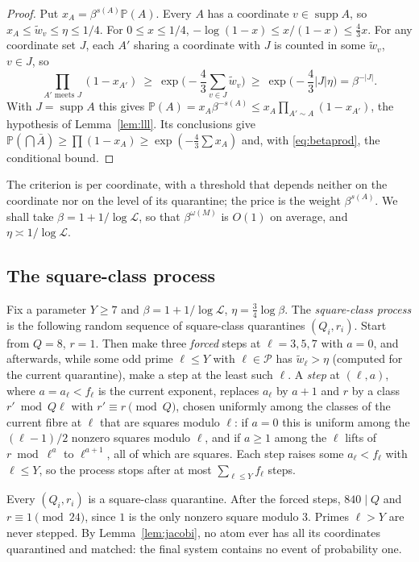 \documentclass[11pt,reqno]{amsart}
\theoremstyle{definition}
\newcommand{\cP}{\mathcal P}
\newcommand{\Lc}{\mathcal L}
\newcommand{\PP}{\mathbb P}
\newcommand{\supp}{\operatorname{supp}}
\begin{document}
\begin{proof}
Put $x_A=\beta^{s(A)}\PP(A)$.  Every $A$ has a coordinate $v\in\supp A$, so
$x_A\le\tilde w_v\le\eta\le1/4$.  For $0\le x\le1/4$,
$-\log(1-x)\le x/(1-x)\le\frac43x$.  For any coordinate set $J$, each $A'$
sharing a coordinate with $J$ is counted in some $\tilde w_v$, $v\in J$, so
\begin{equation}\label{eq:betaprod}
 \prod_{A'\text{ meets }J}(1-x_{A'})\ \ge\ \exp\Big(-\frac43\sum_{v\in J}\tilde w_v\Big)\ \ge\ \exp\Big(-\frac43|J|\eta\Big)=\beta^{-|J|}.
\end{equation}
With $J=\supp A$ this gives $\PP(A)=x_A\beta^{-s(A)}\le x_A\prod_{A'\sim A}(1-x_{A'})$,
the hypothesis of Lemma~\ref{lem:lll}.  Its conclusions give
$\PP(\bigcap\bar A)\ge\prod(1-x_A)\ge\exp(-\frac43\sum x_A)$ and, with
\eqref{eq:betaprod}, the conditional bound.
\end{proof}

The criterion is per coordinate, with a threshold that depends neither on
the coordinate nor on the level of its quarantine; the price is the weight
$\beta^{s(A)}$.  We shall take $\beta=1+1/\log\Lc$, so that $\beta^{\omega(M)}$
is $O(1)$ on average, and $\eta\asymp1/\log\Lc$.

\subsection*{The square-class process}
Fix a parameter $Y\ge7$ and $\beta=1+1/\log\Lc$, $\eta=\frac34\log\beta$.  The
\emph{square-class process} is the following random sequence of square-class
quarantines $(Q_i,r_i)$.  Start from $Q=8$, $r=1$.  Then make three
\emph{forced} steps at $\ell=3,5,7$ with $a=0$, and afterwards, while some
odd prime $\ell\le Y$ with $\ell\in\cP$ has $\tilde w_\ell>\eta$ (computed for the
current quarantine), make a step at the least such $\ell$.  A \emph{step} at
$(\ell,a)$, where $a=a_\ell<f_\ell$ is the current exponent, replaces $a_\ell$ by
$a+1$ and $r$ by a class $r'\bmod Q\ell$ with $r'\equiv r\pmod Q$, chosen
uniformly among the classes of the current fibre at $\ell$ that are squares
modulo $\ell$: if $a=0$ this is uniform among the $(\ell-1)/2$ nonzero squares
modulo $\ell$, and if $a\ge1$ among the $\ell$ lifts of $r\bmod\ell^a$ to
$\ell^{a+1}$, all of which are squares.  Each step raises some $a_\ell<f_\ell$
with $\ell\le Y$, so the process stops after at most $\sum_{\ell\le Y}f_\ell$
steps.

Every $(Q_i,r_i)$ is a square-class quarantine.  After the forced steps,
$840\mid Q$ and $r\equiv1\pmod{24}$, since $1$ is the only nonzero square
modulo $3$.  Primes $\ell>Y$ are never stepped.  By Lemma~\ref{lem:jacobi}, no
atom ever has all its coordinates quarantined and matched: the final system
contains no event of probability one.
\end{document}
